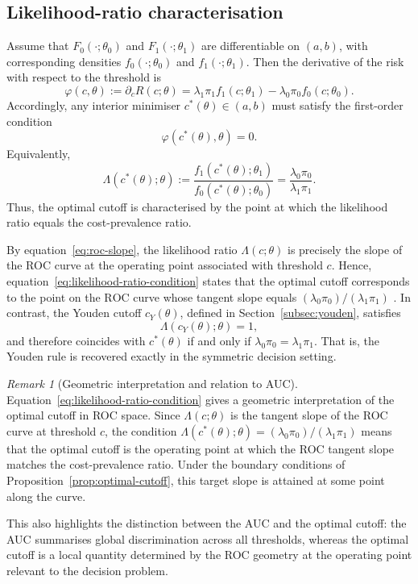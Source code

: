 \documentclass[11pt,a4paper]{article}
\theoremstyle{definition}
\theoremstyle{remark}
\newtheorem{remark}[theorem]{Remark}
\newcommand{\1}{\mathbf{1}}
\begin{document}
\subsection{Likelihood-ratio characterisation}

Assume that $F_0(\cdot;\theta_0)$ and $F_1(\cdot;\theta_1)$ are
differentiable on $(a,b)$, with corresponding densities
$f_0(\cdot;\theta_0)$ and $f_1(\cdot;\theta_1)$.
Then the derivative of the risk with respect to the threshold is
\begin{equation}
\label{eq:estimating-eq}
\varphi(c,\theta)
:=
\partial_c R(c;\theta)
=
\lambda_1\pi_1 f_1(c;\theta_1)
-
\lambda_0\pi_0 f_0(c;\theta_0).
\end{equation}
Accordingly, any interior minimiser $c^*(\theta)\in(a,b)$ must
satisfy the first-order condition
\[
\varphi(c^*(\theta),\theta)=0.
\]
Equivalently,
\begin{equation}
\label{eq:likelihood-ratio-condition}
\Lambda(c^*(\theta);\theta)
:=
\frac{f_1(c^*(\theta);\theta_1)}{f_0(c^*(\theta);\theta_0)}
=
\frac{\lambda_0\pi_0}{\lambda_1\pi_1}.
\end{equation}
Thus, the optimal cutoff is characterised by the point at which
the likelihood ratio equals the cost-prevalence ratio.

By equation~\eqref{eq:roc-slope}, the likelihood ratio
$\Lambda(c;\theta)$ is precisely the slope of the ROC curve at
the operating point associated with threshold $c$. Hence,
equation~\eqref{eq:likelihood-ratio-condition} states that the
optimal cutoff corresponds to the point on the
$\mathrm{ROC}$ curve whose tangent slope equals
$(\lambda_0\pi_0)/(\lambda_1\pi_1)$
\citep{metz1978basic,pepe2003statistical}. In contrast, the
Youden cutoff $c_Y(\theta)$, defined in
Section~\ref{subsec:youden}, satisfies
\[
\Lambda(c_Y(\theta);\theta)=1,
\]
and therefore coincides with $c^*(\theta)$ if and only if $\lambda_0\pi_0=\lambda_1\pi_1.$
That is, the Youden rule is recovered exactly in the symmetric
decision setting.

\begin{remark}[Geometric interpretation and relation to AUC]
\label{rem:auc-connection}
\normalfont
Equation~\eqref{eq:likelihood-ratio-condition} gives a geometric
interpretation of the optimal cutoff in ROC space. Since
$\Lambda(c;\theta)$ is the tangent slope of the ROC curve at
threshold $c$, the condition $\Lambda(c^*(\theta);\theta)=
(\lambda_0\pi_0)/(\lambda_1\pi_1)$ means that the optimal cutoff is the operating point at which
the ROC tangent slope matches the cost-prevalence ratio.
Under the boundary conditions of
Proposition~\ref{prop:optimal-cutoff}, this target slope is
attained at some point along the curve.

This also highlights the distinction between the AUC and the
optimal cutoff: the AUC summarises global discrimination across
all thresholds, whereas the optimal cutoff is a local quantity
determined by the ROC geometry at the operating point relevant
to the decision problem.
\end{remark}
\end{document}
